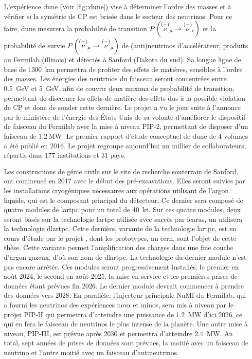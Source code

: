   L'expérience \gls{dune} (voir \autoref{fig::dune}) vise à déterminer l'ordre des masses et à vérifier si la symétrie de CP est brisée dans le secteur des neutrinos. Pour ce faire, \gls{dune} mesurera la probabilité de transition $P\left(\overset{(-)}{\nu}_{\mu}\to\overset{(-)}{\nu}_e\right)$ et la probabilité de survie $P\left(\overset{(-)}{\nu}_{\mu}\to\overset{(-)}{\nu}_{\mu}\right)$ de (anti)neutrinos d'accélérateur, produits au Fermilab (illinois) et détectés à Sanford (Dakota du sud). Sa longue ligne de base de \SI{1300}{\kilo\meter} permettra de profiter des effets de matières, sensibles à l'ordre des masses. Les énergies des neutrinos du faisceau seront concentrées entre \SI{0.5}{\giga\electronvolt} et \SI{5}{\giga\electronvolt}, afin de couvrir deux maxima de probabilité de transition, permettant de discerner les effets de matière des effets dus à la possible violation de CP et donc de sonder cette dernière. Le projet a vu le jour suite à l'annonce par le ministère de l'énergie des États-Unis de sa volonté d'améliorer le dispositif de faisceau du Fermilab avec la mise à niveau PIP-2, permettant de disposer d'un faisceau de $\SI{1.2}{\mega\watt}$\cite{PIPII}. Le premier rapport d'étude conceptuel de \gls{dune} de 4 volumes a été publié en 2016. Le projet regroupe aujourd'hui un millier de collaborateurs, répartis dans 177 institutions et 31 pays.
  
  Les constructions de génie civile sur le site de recherche souterrain de Sanford, ont commencé en 2017 avec le début des pré-excavations. Elles seront suivies par les installations cryogéniques nécessaires aux opérations utilisant de l'argon liquide, qui est le composant principal du détecteur. Ce dernier sera composé de quatre modules de \gls{lartpc} pour un total de \SI{40}{\kilo\tonne}. Sur ces quatre modules, deux seront basés sur la technologie \gls{lartpc} utilisée avec succès par \gls{icarus}, un utilisera la technologie \gls{dlartpc}. Cette dernière, variante de la technologie \gls{lartpc}, est en cours d'étude par le projet  \protodp{}, dont les prototypes, au \gls{cern}, sont l'objet de cette thèse. Cette variante permet l'amplification des charges dans une fine couche d'argon gazeux, d'où son nom de \gls{dlartpc}.  La technologie du dernier module n'est pas encore arrêtée. Ces modules seront progressivement installés, le premier en août 2024, le second en août 2025, la mise en service et les premières prises de données étant prévues fin 2026. Le dernier module devrait commencer à prendre des données vers 2028. En parallèle, l'injecteur principale NuMI du Fermilab, qui a fourni les neutrinos des expériences \gls{nova} et \gls{minos}, sera mis à niveau par le projet PIP-II qui permettra d'atteindre une puissance de \SI{1.2}{\mega\watt} d'ici 2026, ce qui en fera le faisceau de neutrinos le plus intense de la planète. Une autre mise à niveau, PIP-III, est prévue après 2030 et permettra d'atteindre \SI{2.4}{\mega\watt}. Au total, sept années de prises de données sont prévues, la moitié avec un faisceau de neutrino et l'autre moitié avec un faisceau d'antineutrinos.

